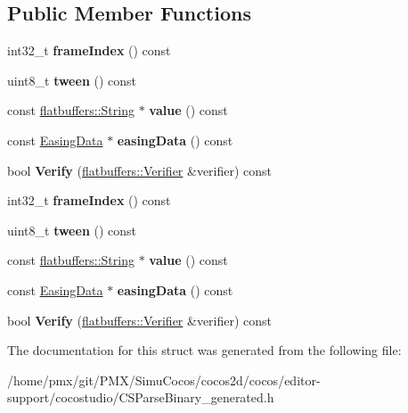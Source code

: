 \subsection*{Public Member Functions}
\begin{DoxyCompactItemize}
\item 
\mbox{\label{structflatbuffers_1_1EventFrame_a72483e1638bd41dfbad05a295ed504e6}} 
int32\+\_\+t {\bfseries frame\+Index} () const
\item 
\mbox{\label{structflatbuffers_1_1EventFrame_ade20f0df6c66b53bb5f3a5ca37c4b7e8}} 
uint8\+\_\+t {\bfseries tween} () const
\item 
\mbox{\label{structflatbuffers_1_1EventFrame_aaa8225cac31a0f8b0f217540ca8d0892}} 
const \hyperlink{structflatbuffers_1_1String}{flatbuffers\+::\+String} $\ast$ {\bfseries value} () const
\item 
\mbox{\label{structflatbuffers_1_1EventFrame_ac7a69073396d67ddc27d6439f2f34080}} 
const \hyperlink{structflatbuffers_1_1EasingData}{Easing\+Data} $\ast$ {\bfseries easing\+Data} () const
\item 
\mbox{\label{structflatbuffers_1_1EventFrame_a3a191e03cb52887b883550e6e766ddd1}} 
bool {\bfseries Verify} (\hyperlink{classflatbuffers_1_1Verifier}{flatbuffers\+::\+Verifier} \&verifier) const
\item 
\mbox{\label{structflatbuffers_1_1EventFrame_a72483e1638bd41dfbad05a295ed504e6}} 
int32\+\_\+t {\bfseries frame\+Index} () const
\item 
\mbox{\label{structflatbuffers_1_1EventFrame_ade20f0df6c66b53bb5f3a5ca37c4b7e8}} 
uint8\+\_\+t {\bfseries tween} () const
\item 
\mbox{\label{structflatbuffers_1_1EventFrame_aaa8225cac31a0f8b0f217540ca8d0892}} 
const \hyperlink{structflatbuffers_1_1String}{flatbuffers\+::\+String} $\ast$ {\bfseries value} () const
\item 
\mbox{\label{structflatbuffers_1_1EventFrame_ac7a69073396d67ddc27d6439f2f34080}} 
const \hyperlink{structflatbuffers_1_1EasingData}{Easing\+Data} $\ast$ {\bfseries easing\+Data} () const
\item 
\mbox{\label{structflatbuffers_1_1EventFrame_a3a191e03cb52887b883550e6e766ddd1}} 
bool {\bfseries Verify} (\hyperlink{classflatbuffers_1_1Verifier}{flatbuffers\+::\+Verifier} \&verifier) const
\end{DoxyCompactItemize}


The documentation for this struct was generated from the following file\+:\begin{DoxyCompactItemize}
\item 
/home/pmx/git/\+P\+M\+X/\+Simu\+Cocos/cocos2d/cocos/editor-\/support/cocostudio/C\+S\+Parse\+Binary\+\_\+generated.\+h\end{DoxyCompactItemize}
